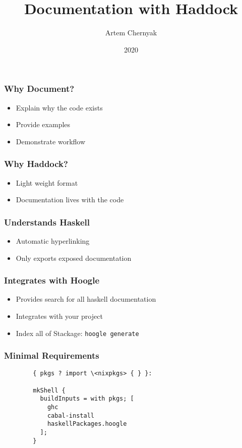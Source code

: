 \documentclass{beamer}
\title{Documentation with Haddock}
\author{Artem Chernyak}
\date{2020}
\newcommand{\code}[1]{{\color{secondary} \texttt{#1}}}
\begin{document}
  \frame{\titlepage}

  \begin{frame}
    \frametitle{Why Document?}
    \begin{itemize}
      \item Explain why the code exists
      \item Provide examples
      \item Demonstrate workflow
    \end{itemize}
  \end{frame}

  \begin{frame}
    \frametitle{Why Haddock?}
    \begin{itemize}
      \item Light weight format
      \item Documentation lives with the code
    \end{itemize}
  \end{frame}

  \begin{frame}
    \frametitle{Understands Haskell}
    \begin{itemize}
      \item Automatic hyperlinking
      \item Only exports exposed documentation
    \end{itemize}
  \end{frame}

  \begin{frame}
    \frametitle{Integrates with Hoogle}
    \begin{itemize}
      \item Provides search for all haskell documentation
      \item Integrates with your project
      \item Index all of Stackage: \code{hoogle generate}
    \end{itemize}
  \end{frame}

  \begin{frame}[fragile]
    \frametitle{Minimal Requirements}
    \begin{example}
      \begin{verbatim}
        { pkgs ? import \<nixpkgs> { } }:

        mkShell {
          buildInputs = with pkgs; [
            ghc
            cabal-install
            haskellPackages.hoogle
          ];
        }
      \end{verbatim}
    \end{example}
  \end{frame}
\end{document}
